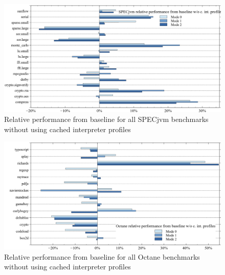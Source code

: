 \begin{figure}[ht]
  \begin{center}
    \centering
    \includegraphics[width=1.0\textwidth]{figures/all_warmup_variation_wo_i.png}
    \caption{Relative performance from baseline for all SPECjvm benchmarks without using cached interpreter profiles}
    \label{f:others_warmup_wo_i}
  \end{center}
\end{figure}
\begin{figure}[ht]
  \begin{center}
    \centering
    \includegraphics[width=1.0\textwidth]{figures/octane_variation_wo_i.png}
    \caption{Relative performance from baseline for all Octane benchmarks without using cached interpreter profiles}
    \label{f:octane_wo_i}
  \end{center}
\end{figure}
\clearpage

